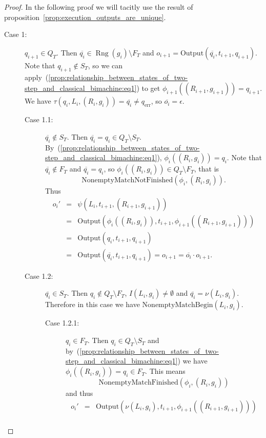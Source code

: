 \documentclass{article}
\DeclareMathOperator{\Rng}{Rng}
\begin{document}
	\begin{proof}
		In the following proof we will tacitly use the result of proposition~\ref{prop:execution_outputs_are_unique}.
		\begin{description}
		\item[Case 1:] $q_{i+1}\in Q_T$.
			Then $\overline{q_i}\in \Rng(g_i)\setminus F_T$ and $o_{i+1} = \mathrm{Output}(\overline{q_i}, t_{i+1}, q_{i+1})$.
			Note that $q_{i+1}\notin S_T$, so we can apply~(\ref{prop:relationship_between_states_of_two-step_and_classical_bimachine:eq1}) to get $\phi_{i+1}((R_{i+1}, g_{i+1})) = q_{i+1}$.
			We have $\tau(q_i, L_i, (R_i, g_i)) = \overline{q_i}\ne q_\mathrm{err}$, so $\overline{o_i} = \epsilon$.
			\begin{description}
			\item[Case 1.1:] $\overline{q_i}\notin S_T$. Then $\overline{q_i} = q_i\in Q_T\setminus S_T$.
				By~(\ref{prop:relationship_between_states_of_two-step_and_classical_bimachine:eq1}), $\phi_i((R_i, g_i)) = q_i$.
				Note that $\overline{q_i}\notin F_T$ and $\overline{q_i} = q_i$, so $\phi_i((R_i, g_i))\in Q_T\setminus F_T$, that is
				\[ \mathrm{NonemptyMatchNotFinished}(\phi_i, (R_i, g_i)). \]
				Thus
				\begin{eqnarray*}
					o_i' &=& \psi(L_i, t_{i+1}, (R_{i+1}, g_{i+1})) \\
						&=& \mathrm{Output}(\phi_i((R_i, g_i)), t_{i+1}, \phi_{i+1}((R_{i+1}, g_{i+1}))) \\
						&=& \mathrm{Output}(q_i, t_{i+1}, q_{i+1}) \\
						&=& \mathrm{Output}(\overline{q_i}, t_{i+1}, q_{i+1}) = o_{i+1} = \overline{o_i}\cdot o_{i+1}.
				\end{eqnarray*}
			\item[Case 1.2:] $\overline{q_i}\in S_T$.
				Then $q_i\notin Q_T\setminus F_T$, $I(L_i, g_i)\ne \emptyset$ and $\overline{q_i} = \nu(L_i, g_i)$. Therefore in this case we have $\mathrm{NonemptyMatchBegin}(L_i, g_i)$.
				\begin{description}
				\item[Case 1.2.1:] $q_i\in F_T$.
					Then $q_i\in Q_T\setminus S_T$ and by~(\ref{prop:relationship_between_states_of_two-step_and_classical_bimachine:eq1}) we have $\phi_i((R_i, g_i)) = q_i\in F_T$. This means
					\[ \mathrm{NonemptyMatchFinished}(\phi_i, (R_i, g_i)) \]
					and thus
					\begin{eqnarray*}
						o_i' &=& \mathrm{Output}(\nu(L_i, g_i), t_{i+1}, \phi_{i+1}((R_{i+1}, g_{i+1}))) \\

\end{eqnarray*}
\end{description}
\end{description}
\end{description}
\end{proof}
\end{document}
